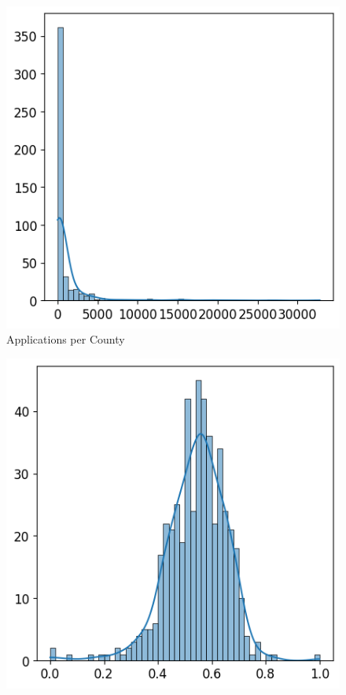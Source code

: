 \begin{figure}[!htbp]
    \centering
    \begin{minipage}{0.33\textwidth}
        \centering
        \includegraphics[width=\textwidth]{images/geo_enrich/predictions_per_county.png}
        \small
        Applications per County
    \end{minipage}\hfill
    \begin{minipage}{0.33\textwidth}
        \centering
        \includegraphics[width=\textwidth]{images/geo_enrich/perc_predictions.png}

\end{minipage}
\end{figure}
